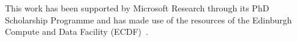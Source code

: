 This work has been supported by Microsoft Research through its PhD Scholarship Programme and has made use of the resources of the Edinburgh Compute and Data Facility (ECDF)~\cite{ecdf}.
